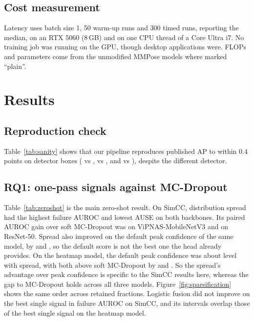 \documentclass[preprint,11pt]{elsarticle}
\begin{document}
\subsection{Cost measurement}

Latency uses batch size 1, 50 warm-up runs and 300 timed runs, reporting the median, on an RTX 5060
(8\,GB) and on one CPU thread of a Core Ultra i7. No training job was running on the GPU, though
desktop applications were. FLOPs and parameters come from the unmodified MMPose models where
marked ``plain''.

\section{Results}

\subsection{Reproduction check}

Table~\ref{tab:sanity} shows that our pipeline reproduces published AP to within 0.4 points on
detector boxes (\ApDetZsSimccRFiveZero{} vs \ApPubZsSimccRFiveZero{},
\ApDetZsSimccMbvThree{} vs \ApPubZsSimccMbvThree{}, and \ApDetZsHmRFiveZero{} vs
\ApPubZsHmRFiveZero{}), despite the different detector.

\begin{table}[t]
\centering\small
\caption{AP on all val2017 images, with default instance scores.
$^\dagger$MMPose model zoo values, not re-measured, obtained with a different detector.}
\label{tab:sanity}
\end{table}

\subsection{RQ1: one-pass signals against MC-Dropout}

Table~\ref{tab:zeroshot} is the main zero-shot result. On SimCC, distribution spread had the
highest failure AUROC and lowest AUSE on both backbones. Its paired AUROC gain over soft
MC-Dropout was \DfaZsSimccMbvThreeDistMinusMc{} on ViPNAS-MobileNetV3 and
\DfaZsSimccRFiveZeroDistMinusMc{} on ResNet-50. Spread also improved on the default peak confidence
of the same model, by \DfaZsSimccMbvThreeDistMinusConf{} and \DfaZsSimccRFiveZeroDistMinusConf{},
so the default score is not the best one the head already provides. On the heatmap model, the
default peak confidence was about level with spread, with both above soft MC-Dropout by
\DfaZsHmRFiveZeroConfMinusMc{} and \DfaZsHmRFiveZeroDistMinusMc{}. So the spread's advantage over
peak confidence is specific to the SimCC results here, whereas the gap to MC-Dropout holds across
all three models. Figure~\ref{fig:sparsification} shows the same order across retained fractions.
Logistic fusion did not improve on the best single signal in failure AUROC on SimCC, and its
intervals overlap those of the best single signal on the heatmap model.
\end{document}
